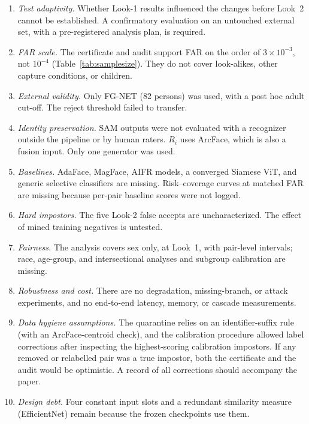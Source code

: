 \documentclass[journal]{IEEEtran}
\begin{document}
\begin{enumerate}
\item \emph{Test adaptivity.} Whether Look-1 results influenced the changes before Look~2 cannot be established. A confirmatory evaluation on an untouched external set, with a pre-registered analysis plan, is required.
\item \emph{FAR scale.} The certificate and audit support FAR on the order of $3\times10^{-3}$, not $10^{-4}$ (Table~\ref{tab:samplesize}). They do not cover look-alikes, other capture conditions, or children.
\item \emph{External validity.} Only FG-NET (82 persons) was used, with a post hoc adult cut-off. The reject threshold failed to transfer.
\item \emph{Identity preservation.} SAM outputs were not evaluated with a recognizer outside the pipeline or by human raters. $R_i$ uses ArcFace, which is also a fusion input. Only one generator was used.
\item \emph{Baselines.} AdaFace, MagFace, AIFR models, a converged Siamese ViT, and generic selective classifiers are missing. Risk--coverage curves at matched FAR are missing because per-pair baseline scores were not logged.
\item \emph{Hard impostors.} The five Look-2 false accepts are uncharacterized. The effect of mined training negatives is untested.
\item \emph{Fairness.} The analysis covers sex only, at Look~1, with pair-level intervals; race, age-group, and intersectional analyses and subgroup calibration are missing.
\item \emph{Robustness and cost.} There are no degradation, missing-branch, or attack experiments, and no end-to-end latency, memory, or cascade measurements.
\item \emph{Data hygiene assumptions.} The quarantine relies on an identifier-suffix rule (with an ArcFace-centroid check), and the calibration procedure allowed label corrections after inspecting the highest-scoring calibration impostors. If any removed or relabelled pair was a true impostor, both the certificate and the audit would be optimistic. A record of all corrections should accompany the paper.
\item \emph{Design debt.} Four constant input slots and a redundant similarity measure (EfficientNet) remain because the frozen checkpoints use them.
\end{enumerate}

\end{document}

